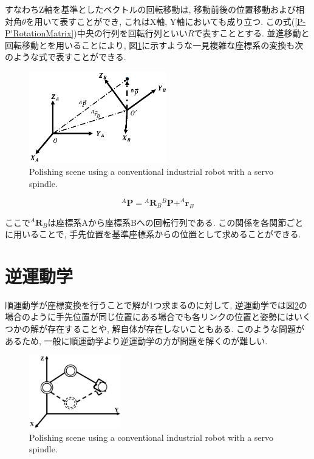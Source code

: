 \documentclass{suribt}
\begin{document}
 すなわちZ軸を基準としたベクトルの回転移動は, 移動前後の位置移動および相対角$\theta$を用いて表すことができ, これはX軸, Y軸においても成り立つ. この式(\ref{P-P'RotationMatrix})中央の行列を回転行列といい$R$で表すこととする. 
並進移動と回転移動とを用いることにより, 図\ref{fig:ComplexTransform}に示すような一見複雑な座標系の変換も次のような式で表すことができる.

\begin{figure}[ht]
 \begin{center}
  \includegraphics[width=60mm,clip]{./figure/ComplexTransformation.eps}
  \caption{Polishing scene using a conventional industrial robot with a servo spindle.}
  \label{fig:ComplexTransform}
 \end{center}
\end{figure}

\begin{equation}
	^{A}{\bm P} = {^{A}{\bm R}_B}{^{B}{\bm P}} + ^{A}{\bm r}_B
\end{equation}

 ここで${^{A}{\bm R}_B}$は座標系Aから座標系Bへの回転行列である. この関係を各関節ごとに用いることで, 手先位置を基準座標系からの位置として求めることができる.

\section{逆運動学}
順運動学が座標変換を行うことで解が1つ求まるのに対して, 逆運動学では図\ref{fig:InverseKinematics}の場合のように手先位置が同じ位置にある場合でも各リンクの位置と姿勢にはいくつかの解が存在することや, 解自体が存在しないこともある. このような問題があるため, 一般に順運動学より逆運動学の方が問題を解くのが難しい.
\begin{figure}[ht]
 \begin{center}
  \includegraphics[width=40mm,clip]{./figure/InverseKinematics.eps}
  \caption{Polishing scene using a conventional industrial robot with a servo spindle.}
  \label{fig:InverseKinematics}
 \end{center}
\end{figure}
\end{document}
